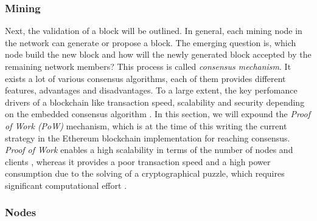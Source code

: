 \subsubsection{Mining}
\label{sec:mining}
Next, the validation of a block will be outlined. In general, each mining node in the 
network can generate or propose a block. The emerging question is, which node build the new 
block and how will the newly generated block accepted by the remaining network members? 
This process is called \textit{consensus mechanism}.
It exists a lot of various consensus algorithms, each of them provides different features,
advantages and disadvantages. To a large extent, the key perfomance drivers of a blockchain
like transaction speed, scalability and security depending on the embedded consensus algorithm . 
In this section, we will expound the \textit{Proof of Work (PoW)} mechanism, 
which is at the time of this writing the current strategy in the Ethereum blockchain 
implementation for reaching consensus. 
\textit{Proof of Work} enables a high scalability in terms of the number 
of nodes and clients , whereas it provides a poor transaction speed and a high 
power consumption due to the solving of a cryptographical puzzle, which requires 
significant computational effort . 




\subsubsection{Nodes}
\label{sec:nodes}


\clearpage